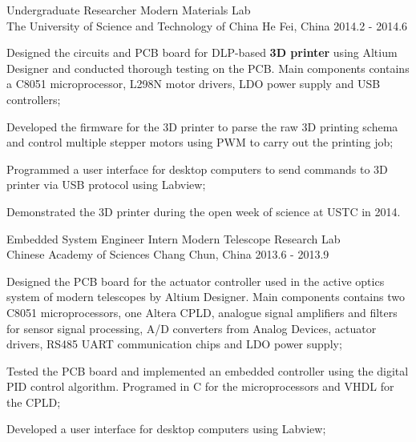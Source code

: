 \begin{cventries}
    \cventry
      {Undergraduate Researcher}%
      {Modern Materials Lab \\ The University of Science and Technology of China}%
      {He Fei, China}%
      {2014.2 - 2014.6}%
      {
        \begin{cvitems}
          \item Designed the circuits and PCB board for DLP-based \textbf{3D printer} using Altium Designer and conducted thorough testing on the PCB. Main components contains a C8051 microprocessor, L298N motor drivers, LDO power supply and USB controllers;
          \item Developed the firmware for the 3D printer to parse the raw 3D printing schema and control multiple stepper motors using PWM to carry out the printing job;
          \item Programmed a user interface for desktop computers to send commands to 3D printer via USB protocol using Labview;
          \item Demonstrated the 3D printer during the open week of science at USTC in 2014.
        \end{cvitems}
      }

      \cventry
        {Embedded System Engineer Intern}%
        {Modern Telescope Research Lab \\ Chinese Academy of Sciences}%
        {Chang Chun, China}%
        {2013.6 - 2013.9}%
        {
          \begin{cvitems}
            \item Designed the PCB board for the actuator controller used in the active optics system of modern telescopes by Altium Designer. Main components contains two C8051 microprocessors, one Altera CPLD, analogue signal amplifiers and filters for sensor signal processing, A/D converters from Analog Devices, actuator drivers, RS485 UART communication chips and LDO power supply;
            \item Tested the PCB board and implemented an embedded controller using the digital PID control algorithm. Programed in C for the microprocessors and VHDL for the CPLD;
            \item Developed a user interface for desktop computers using Labview;
          \end{cvitems}
        }


\end{cventries}
